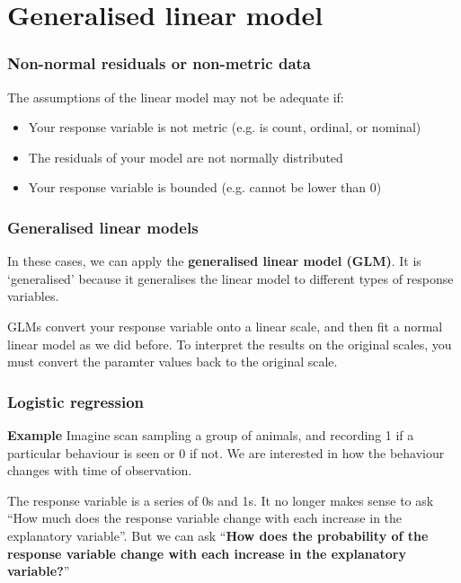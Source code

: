 \documentclass{beamer}
\begin{document}
\section{Generalised linear model}
\begin{frame}
  \frametitle{Non-normal residuals or non-metric data}
  The assumptions of the linear model may not be adequate if:
  \begin{itemize}
    \item Your response variable is not metric (e.g. is count, ordinal, or nominal)
    \item The residuals of your model are not normally distributed
    \item Your response variable is bounded (e.g. cannot be lower than 0)
  \end{itemize}
\end{frame}
\begin{frame}
  \frametitle{Generalised linear models}
  In these cases, we can apply the \textbf{generalised linear model (GLM)}. It is `generalised' because it generalises the linear model to different types of response variables. \\ \vspace{1cm}

  GLMs convert your response variable onto a linear scale, and then fit a normal linear model as we did before. To interpret the results on the original scales, you must convert the paramter values back to the original scale.
\end{frame}
\begin{frame}
  \frametitle{Logistic regression}
  \begin{block}{\textbf{Example}}
    Imagine scan sampling a group of animals, and recording 1 if a particular behaviour is seen or 0 if not. We are interested in how the behaviour changes with time of observation.\\ \vspace{1cm}

    The response variable is a series of 0s and 1s. It no longer makes sense to ask ``How much does the response variable change with each increase in the explanatory variable''. But we can ask ``\textbf{How does the probability of the response variable change with each increase in the explanatory variable?}''
  \end{block}
\end{frame}
\end{document}
